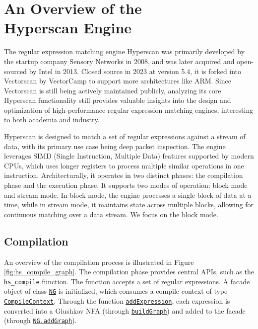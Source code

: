 \chapter[An Overview of the Hyperscan Engine]{An Overview of the \\ Hyperscan Engine}

The regular expression matching engine Hyperscan \cite{wang2019hyperscan} was primarily developed by the startup company Sensory Networks in 2008, and was later acquired and open-sourced by Intel in 2013. Closed source in 2023 at version 5.4, it is forked into Vectorscan \cite{vectorscan} by VectorCamp to support more architectures like ARM. Since Vectorscan is still being actively maintained publicly, analyzing its core Hyperscan functionality still provides valuable insights into the design and optimization of high-performance regular expression matching engines, interesting to both academia and industry.

Hyperscan is designed to match a set of regular expressions against a stream of data, with its primary use case being deep packet inspection. The engine leverages SIMD (Single Instruction, Multiple Data) features supported by modern CPUs, which uses longer registers to process multiple similar operations in one instruction. Architecturally, it operates in two distinct phases: the compilation phase and the execution phase. It supports two modes of operation: block mode and stream mode. In block mode, the engine processes a single block of data at a time, while in stream mode, it maintains state across multiple blocks, allowing for continuous matching over a data stream. We focus on the block mode.




\section{Compilation}

An overview of the compilation process is illustrated in Figure \ref{fig:hs_compile_graph}. The compilation phase provides central APIs, such as the \href{https://github.com/intel/hyperscan/blob/master/src/hs_compile.h#L360}{\texttt{hs\_compile}} function. The function accepts a set of regular expressions. A facade object of class \href{https://github.com/intel/hyperscan/blob/master/src/nfagraph/ng.h#L63}{\texttt{NG}} is initialized, which consumes a compile context of type \href{https://github.com/intel/hyperscan/blob/master/src/util/compile_context.h#L43}{\texttt{CompileContext}}. Through the function \href{https://github.com/intel/hyperscan/blob/master/src/compiler/compiler.h#L116}{\texttt{addExpression}}, each expression is converted into a Glushkov NFA \cite{glushkov1961abstract} (through \href{https://github.com/intel/hyperscan/blob/master/src/compiler/compiler.h#L151}{\texttt{buildGraph}}) and added to the facade (through \href{https://github.com/intel/hyperscan/blob/master/src/nfagraph/ng.h#L71}{\texttt{NG.addGraph}}).

